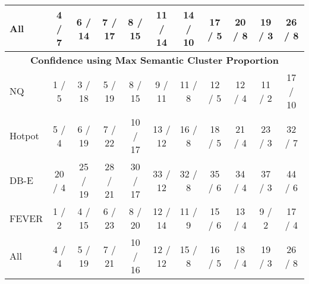 \begin{table}[h]
{\begin{tabular}{lcccccccccc}
All & 4 / 7 & 6 / 14 & 7 / 17 & 8 / 15 & 11 / 14 & 14 / 10 & 17 / 5 & 20 / 8 & 19 / 3 & 26 / 8 \\
\hline\hline
\multicolumn{11}{c}{\textbf{Confidence using Max Semantic Cluster Proportion}} \\
\hline
NQ & 1 / 5 & 3 / 18 & 5 / 19 & 8 / 15 & 9 / 11 & 11 / 8 & 12 / 5 & 12 / 4 & 11 / 2 & 17 / 10 \\
Hotpot & 5 / 4 & 6 / 19 & 7 / 22 & 10 / 17 & 13 / 12 & 16 / 8 & 18 / 5 & 21 / 4 & 23 / 3 & 32 / 7 \\
DB-E & 20 / 4 & 25 / 19 & 28 / 21 & 30 / 17 & 33 / 12 & 32 / 8 & 35 / 6 & 34 / 4 & 37 / 3 & 44 / 6 \\
FEVER & 1 / 2 & 4 / 15 & 6 / 23 & 8 / 20 & 12 / 14 & 11 / 9 & 15 / 6 & 13 / 4 & 9 / 2 & 17 / 4 \\
All & 4 / 4 & 5 / 19 & 7 / 21 & 10 / 16 & 12 / 12 & 15 / 8 & 16 / 5 & 18 / 4 & 19 / 3 & 26 / 8 \\
\hline\hline
\end{tabular}
}
\end{table}